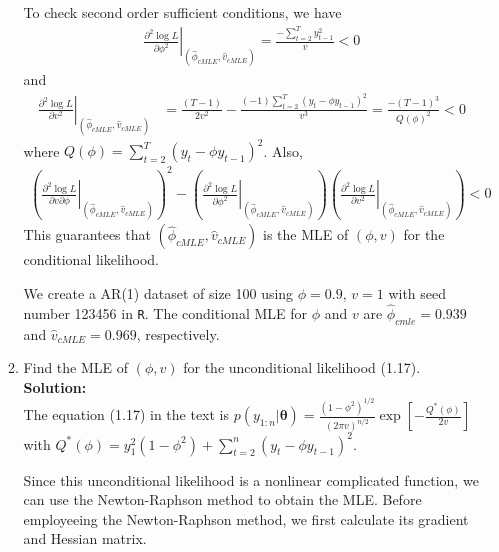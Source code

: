 \documentclass[12pt]{article}\usepackage[]{graphicx}\usepackage[]{color}
\begin{document}
\begin{enumerate}
\begin{enumerate}
	To check second order sufficient conditions, we have
	\begin{align*}
		\left.\frac{\partial^2 \log L}{\partial \phi ^2} \right| _{(\hat{\phi}_{cMLE}, \hat{v}_{cMLE})} = \frac{-\sum _{t=2}^Ty_{t-1}^2}{v} < 0
		\end{align*}
		and
	\begin{align*}
		\left.\frac{\partial ^ 2 \log L}{\partial v^2} \right|_{(\hat{\phi}_{cMLE}, \hat{v}_{cMLE})} &= \frac{(T-1)}{2v^2} -\frac{(-1)\sum _{t=2}^T (y_t- \phi y_{t-1})^2}{v^3} =\frac{-(T-1)^3}{Q(\phi)^2} < 0  
	\end{align*}
	where $Q(\phi) = \sum _{t=2}^T (y_t- \phi y_{t-1})^2$. Also,
	\begin{align*}
		\left( \left.\frac{\partial ^ 2 \log L}{\partial v \partial \phi} \right|_{(\hat{\phi}_{cMLE}, \hat{v}_{cMLE})} \right) ^2 - \left( \left.\frac{\partial^2 \log L}{\partial \phi ^2} \right| _{(\hat{\phi}_{cMLE}, \hat{v}_{cMLE})}\right) \left( \left.\frac{\partial ^ 2 \log L}{\partial v^2} \right|_{(\hat{\phi}_{cMLE}, \hat{v}_{cMLE})}\right) < 0
	\end{align*}
	This guarantees that $(\hat{\phi}_{cMLE}, \hat{v}_{cMLE})$ is the MLE of $(\phi, v)$ for the conditional likelihood.
	



	We create a AR(1) dataset of size 100 using $\phi = 0.9$, $v = 1$ with seed number 123456 in \texttt{R}. The conditional MLE for $\phi$ and $v$ are $\hat{\phi}_{cmle} = 0.939$ and $\hat{v}_{cMLE} = 0.969$, respectively.
	
	\item Find the MLE of $(\phi, v)$ for the unconditional likelihood (1.17).\\
	\textbf{Solution:}\\
	The equation (1.17) in the text is $p(y_{1:n}|\boldsymbol{\theta}) = \frac{(1 - \phi ^2)^{1/2}}{(2 \pi  v)^{n/2}} \exp \left[ - \frac{Q ^ * (\phi)}{2v} \right]$ with $ Q ^ * (\phi)  = y_1 ^ 2 (1 - \phi ^2) + \sum _{t=2}^n (y_t - \phi y_{t-1})^2$.
	
	Since this unconditional likelihood is a nonlinear complicated function, we can use the Newton-Raphson method to obtain the MLE. Before employeeing the Newton-Raphson method, we first calculate its gradient and Hessian matrix.
	

\end{enumerate}
\end{enumerate}
\end{document}
